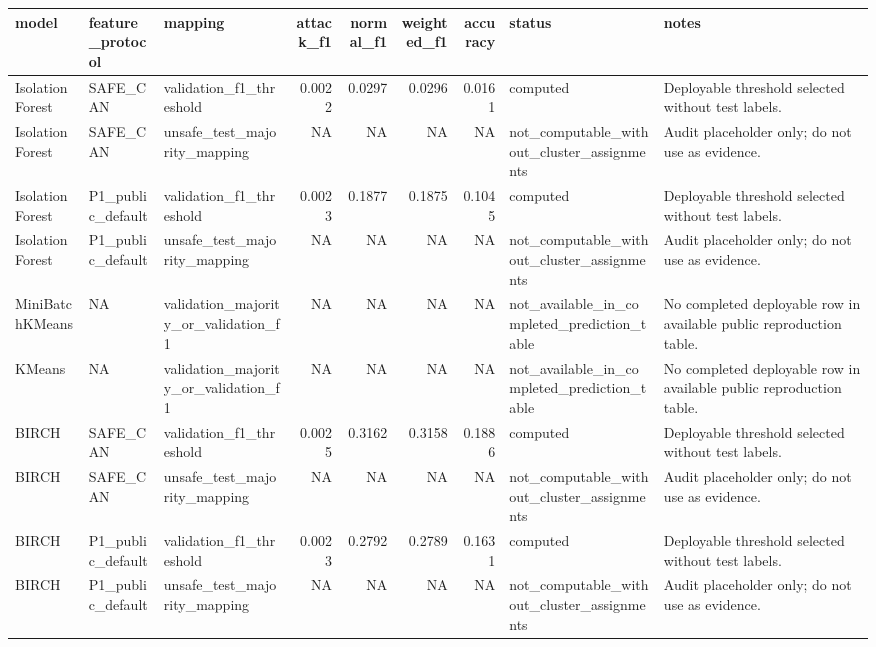 \begin{tabular}{lllrrrrll}
\toprule
model & feature\_protocol & mapping & attack\_f1 & normal\_f1 & weighted\_f1 & accuracy & status & notes \\
\midrule
IsolationForest & SAFE\_CAN & validation\_f1\_threshold & 0.0022 & 0.0297 & 0.0296 & 0.0161 & computed & Deployable threshold selected without test labels. \\
IsolationForest & SAFE\_CAN & unsafe\_test\_majority\_mapping & NA & NA & NA & NA & not\_computable\_without\_cluster\_assignments & Audit placeholder only; do not use as evidence. \\
IsolationForest & P1\_public\_default & validation\_f1\_threshold & 0.0023 & 0.1877 & 0.1875 & 0.1045 & computed & Deployable threshold selected without test labels. \\
IsolationForest & P1\_public\_default & unsafe\_test\_majority\_mapping & NA & NA & NA & NA & not\_computable\_without\_cluster\_assignments & Audit placeholder only; do not use as evidence. \\
MiniBatchKMeans & NA & validation\_majority\_or\_validation\_f1 & NA & NA & NA & NA & not\_available\_in\_completed\_prediction\_table & No completed deployable row in available public reproduction table. \\
KMeans & NA & validation\_majority\_or\_validation\_f1 & NA & NA & NA & NA & not\_available\_in\_completed\_prediction\_table & No completed deployable row in available public reproduction table. \\
BIRCH & SAFE\_CAN & validation\_f1\_threshold & 0.0025 & 0.3162 & 0.3158 & 0.1886 & computed & Deployable threshold selected without test labels. \\
BIRCH & SAFE\_CAN & unsafe\_test\_majority\_mapping & NA & NA & NA & NA & not\_computable\_without\_cluster\_assignments & Audit placeholder only; do not use as evidence. \\
BIRCH & P1\_public\_default & validation\_f1\_threshold & 0.0023 & 0.2792 & 0.2789 & 0.1631 & computed & Deployable threshold selected without test labels. \\
BIRCH & P1\_public\_default & unsafe\_test\_majority\_mapping & NA & NA & NA & NA & not\_computable\_without\_cluster\_assignments & Audit placeholder only; do not use as evidence. \\
\bottomrule
\end{tabular}
